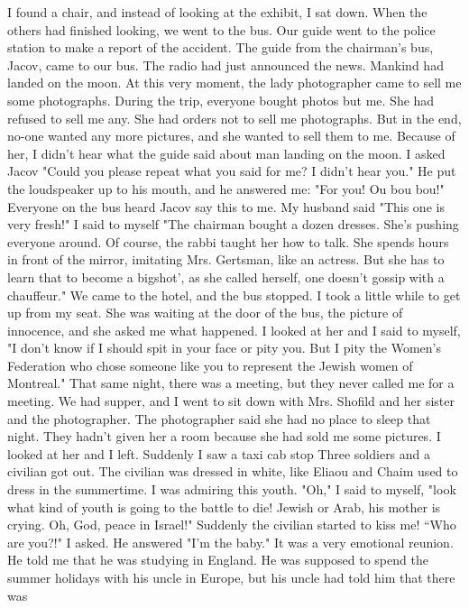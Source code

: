 I found a chair, and instead 
of looking at the exhibit, I sat down.
When the others had finished looking, we went to the bus.
Our guide went to the police station to make a 
report of the accident.
The guide from the chairman's bus, Jacov, came to 
our bus.
The radio had just announced the news.
Mankind had landed on the moon.
At this very moment, the lady photographer came to sell me some photographs.
During the trip, everyone bought photos but me.
She had refused to sell me 
any.
She had orders not to sell me photographs.
But in the end, no-one 
wanted any more pictures, and she wanted to sell them to me.
Because of 
her, I didn't hear what the guide said about man landing on the moon.
I asked Jacov "Could you please repeat what you said for me?
I didn't 
hear you."
He put the loudspeaker up to his mouth, and he answered me: 
"For you!
Ou bou bou!"
Everyone on the bus heard Jacov say this to me.
My husband said "This one is very fresh!"
I said to myself "The chairman 
bought a dozen dresses.
She's pushing everyone around.
Of course, the 
rabbi taught her how to talk.
She spends hours in front of the mirror, imitating Mrs.
Gertsman, like an actress.
But she has to learn that to become a bigshot', as she called herself, one doesn't gossip with a chauffeur."
We came to the hotel, and the bus stopped.
I took a little while to 
get up from my seat.
She was waiting at the door of the bus, the picture 
of innocence, and she asked me what happened.
I looked at her and I said 
to myself, "I don't know if I should spit in your face or pity you.
But I 
pity the Women's Federation who chose someone like you to represent the 
Jewish women of Montreal."
That same night, there was a meeting, but they never called me for a meeting.
We had supper, and I went to sit down with Mrs.
Shofild and her sister and the photographer.
The photographer said she had no place to sleep that night.
They hadn't given her a room because she had sold me 
some pictures.
I looked at her and I left.
Suddenly I saw a taxi cab stop 
Three soldiers and a civilian got out.
The civilian was dressed in white, 
like Eliaou and Chaim used to dress in the summertime.
I was admiring this 
youth.
"Oh," I said to myself, "look what kind of youth is going to the 
battle to die!
Jewish or Arab, his mother is crying.
Oh, God, peace in 
Israel!"
Suddenly the civilian started to kiss me!
“Who are you?!"
I 
asked.
He answered "I'm the baby."
It was a very emotional reunion.
He 
told me that he was studying in England.
He was supposed to spend the summer 
holidays with his uncle in Europe, but his uncle had told him that there was
